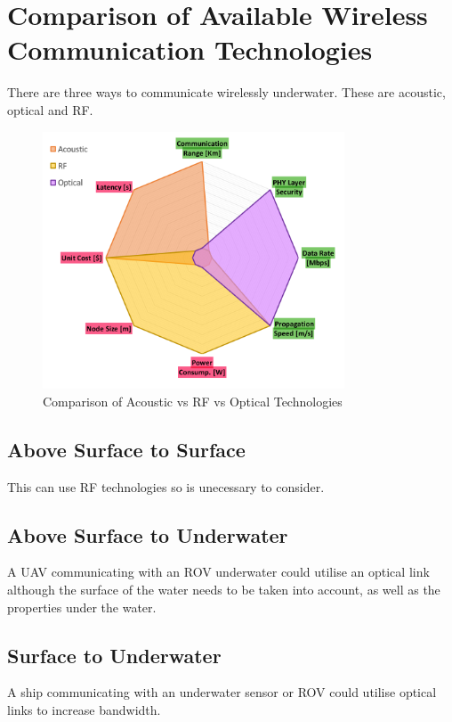 \section{Comparison of Available Wireless Communication Technologies}

There are three ways to communicate wirelessly underwater. These are
acoustic, optical and \ac{RF}.

\begin{figure}[H]
  \includegraphics[width=0.8\textwidth]{acoustic_rf_optical_comparison.png}
  \caption{Comparison of Acoustic vs RF vs Optical Technologies}
  \label{fig:acoustic_rf_optical_comparison}
\end{figure}

\subsection{Above Surface to Surface}
This can use RF technologies so is unecessary to consider.

\subsection{Above Surface to Underwater}
A \ac{UAV} communicating with an \ac{ROV} underwater could utilise an optical
link although the surface of the water needs to be taken into account, as well
as the properties under the water.

\subsection{Surface to Underwater}
A ship communicating with an underwater sensor or \ac{ROV} could utilise
optical links to increase bandwidth.

